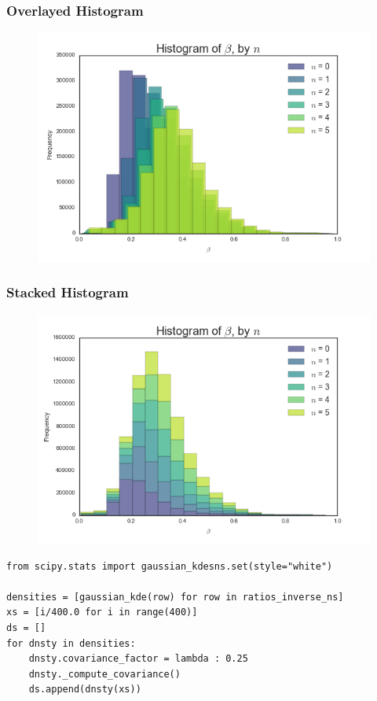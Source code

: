 \documentclass{beamer}
\begin{document}
\begin{frame}
\frametitle{Overlayed Histogram}
\begin{figure}
	\includegraphics[width=\textwidth]{hist_overlay}
\end{figure}
\end{frame}

\begin{frame}
\frametitle{Stacked Histogram}
\begin{figure}
	\includegraphics[width=\textwidth]{stacked_hist}
\end{figure}
\end{frame}

\begin{frame}[fragile]
\small{
\begin{verbatim}
from scipy.stats import gaussian_kdesns.set(style="white")

densities = [gaussian_kde(row) for row in ratios_inverse_ns]
xs = [i/400.0 for i in range(400)]
ds = []
for dnsty in densities:
    dnsty.covariance_factor = lambda : 0.25
    dnsty._compute_covariance()
    ds.append(dnsty(xs))
\end{verbatim}
}
\end{frame}
\end{document}
